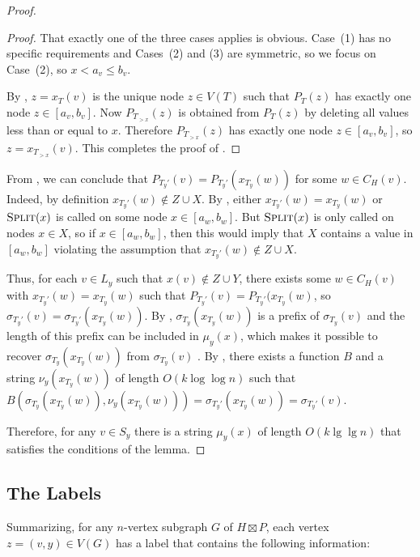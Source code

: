 \documentclass[kpfonts]{patmorin}
\begin{document}
\begin{proof}
  \begin{proof}
    That exactly one of the three cases applies is obvious.  Case~(1) has no specific requirements and Cases~(2) and (3) are symmetric, so we focus on Case~(2), so $x < a_v\le b_v$.
    
    By , $z=x_T(v)$ is the unique node $z\in V(T)$ such that $P_T(z)$ has exactly one node $z\in [a_v,b_v]$.  Now $P_{T_{>x}}(z)$ is obtained from $P_T(z)$ by deleting all values less than or equal to $x$. Therefore $P_{T_{>x}}(z)$ has exactly one node $z\in[a_v,b_v]$, so $z=x_{T_{>x}}(v)$.  This completes the proof of .
  \end{proof}
  
  From , we can conclude that $P_{T_y'}(v)=P_{T_y'}(x_{T_y}(w))$ for some $w\in C_H(v)$.  Indeed, by definition $x_{T_y'}(w)\not\in Z\cup X$. By , either $x_{T_y'}(w)=x_{T_y}(w)$ or $\textsc{Split}(x)$ is called on some node $x\in[a_w,b_w]$.  But $\textsc{Split}(x)$ is only called on nodes $x\in X$, so if $x\in[a_w,b_w]$, then this would imply that $X$ contains a value in $[a_w,b_w]$ violating the assumption that $x_{T_y'}(w)\not\in Z\cup X$.
  
  Thus, for each $v\in L_y$ such that $x(v)\not\in Z\cup Y$, there exists some $w\in C_H(v)$ with $x_{T_y'}(w)=x_{T_y}(w)$ such that $P_{T_y'}(v)=P_{T_y'}(x_{T_y}(w)$, so $\sigma_{T_y'}(v)=\sigma_{T_y'}(x_{T_y}(w))$.  By , $\sigma_{T_y}(x_{T_y}(w))$ is a prefix of $\sigma_{T_y}(v)$ and the length of this prefix can be included in $\mu_y(x)$, which makes it possible to recover $\sigma_{T_y}(x_{T_y}(w))$ from $\sigma_{T_y}(v)$ .  By , there exists a function $B$ and a string $\nu_y(x_{T_y}(w))$ of length $O(k\log\log n)$ such that $B(\sigma_{T_y}(x_{T_y}(w)), \nu_y(x_{T_y}(w))) = \sigma_{T_y'}(x_{T_y}(w)) = \sigma_{T_y'}(v)$.
  
  Therefore, for any $v\in S_y$ there is a string $\mu_y(x)$ of length $O(k\lg\lg n)$ that satisfies the conditions of the lemma.
\end{proof}
  
\subsection{The Labels}

Summarizing, for any $n$-vertex subgraph $G$ of $H\boxtimes P$, each vertex $z=(v,y)\in V(G)$ has a label that contains the following information:
\end{document}
